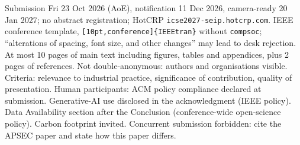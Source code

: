 Submission Fri 23 Oct 2026 (AoE), notification 11 Dec 2026, camera-ready 20 Jan 2027; no abstract registration; HotCRP \texttt{icse2027-seip.hotcrp.com}.
IEEE conference template, \texttt{[10pt,conference]\{IEEEtran\}} without \texttt{compsoc}; ``alterations of spacing, font size, and other changes'' may lead to desk rejection.
At most 10 pages of main text including figures, tables and appendices, plus 2 pages of references.
Not double-anonymous: authors and organisations visible.
Criteria: relevance to industrial practice, significance of contribution, quality of presentation.
Human participants: ACM policy compliance declared at submission.
Generative-AI use disclosed in the acknowledgment (IEEE policy).
Data Availability section after the Conclusion (conference-wide open-science policy).
Carbon footprint invited.
Concurrent submission forbidden: cite the APSEC paper and state how this paper differs.
